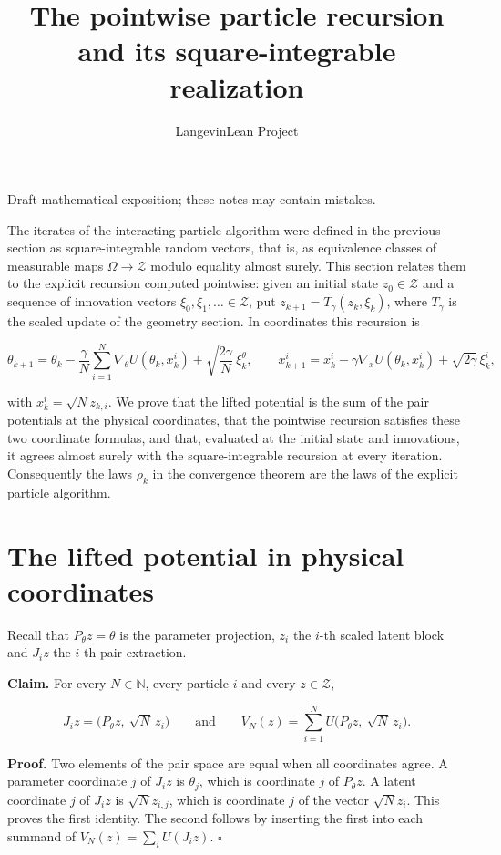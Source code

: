 \documentclass[11pt,a4paper]{article}
\title{\texorpdfstring{The pointwise particle recursion and its square-integrable realization}{The pointwise particle recursion and its square-integrable realization}}
\author{LangevinLean Project}
\date{}
\begin{document}
\maketitle
Draft mathematical exposition; these notes may contain mistakes.


The iterates of the interacting particle algorithm were defined in the previous section as square-integrable random vectors, that is, as equivalence classes of measurable maps \(\Omega\to\mathcal Z\) modulo equality almost surely. This section relates them to the explicit recursion computed pointwise: given an initial state \(z_0\in\mathcal Z\) and a sequence of innovation vectors \(\xi_0,\xi_1,\dots\in\mathcal Z\), put \(z_{k+1}=T_\gamma(z_k,\xi_k)\), where \(T_\gamma\) is the scaled update of the geometry section. In coordinates this recursion is


\[\theta_{k+1}=\theta_k-\frac\gamma N\sum_{i=1}^N\nabla_\theta U(\theta_k,x_k^i)+\sqrt{\frac{2\gamma}N}\,\xi_k^\theta,\qquad x_{k+1}^i=x_k^i-\gamma\nabla_xU(\theta_k,x_k^i)+\sqrt{2\gamma}\,\xi_k^i,\]


with \(x_k^i=\sqrt N z_{k,i}\). We prove that the lifted potential is the sum of the pair potentials at the physical coordinates, that the pointwise recursion satisfies these two coordinate formulas, and that, evaluated at the initial state and innovations, it agrees almost surely with the square-integrable recursion at every iteration. Consequently the laws \(\rho_k\) in the convergence theorem are the laws of the explicit particle algorithm.


\section{\texorpdfstring{The lifted potential in physical coordinates}{The lifted potential in physical coordinates}}


Recall that \(P_\theta z=\theta\) is the parameter projection, \(z_i\) the \(i\)-th scaled latent block and \(J_iz\) the \(i\)-th pair extraction.




\textbf{Claim.} For every \(N\in\mathbb N\), every particle \(i\) and every \(z\in\mathcal Z\),


\[J_iz=\bigl(P_\theta z,\ \sqrt N\,z_i\bigr)\qquad\text{and}\qquad V_N(z)=\sum_{i=1}^NU\bigl(P_\theta z,\ \sqrt N\,z_i\bigr).\]


\textbf{Proof.} Two elements of the pair space are equal when all coordinates agree. A parameter coordinate \(j\) of \(J_iz\) is \(\theta_j\), which is coordinate \(j\) of \(P_\theta z\). A latent coordinate \(j\) of \(J_iz\) is \(\sqrt N z_{i,j}\), which is coordinate \(j\) of the vector \(\sqrt N z_i\). This proves the first identity. The second follows by inserting the first into each summand of \(V_N(z)=\sum_iU(J_iz)\). \(\square\)
\end{document}
